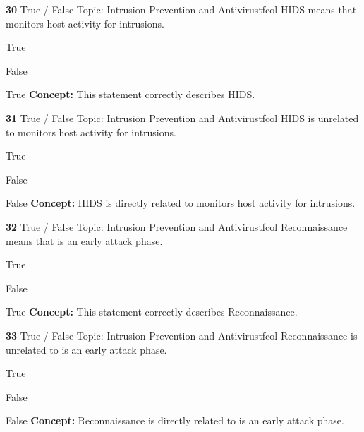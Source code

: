 \documentclass[10pt,a4paper]{article}
\begin{document}
\begin{qcard}{\color{white}\textbf{30} \hfill \small True / False \textbar{} Topic: Intrusion Prevention and Antivirus}{tfcol}
HIDS means that monitors host activity for intrusions.

\begin{qoptions}
\item True
\item False
\end{qoptions}
\begin{explainbox}{True}
\textbf{Concept:} This statement correctly describes HIDS.
\end{explainbox}
\end{qcard}

\begin{qcard}{\color{white}\textbf{31} \hfill \small True / False \textbar{} Topic: Intrusion Prevention and Antivirus}{tfcol}
HIDS is unrelated to monitors host activity for intrusions.

\begin{qoptions}
\item True
\item False
\end{qoptions}
\begin{explainbox}{False}
\textbf{Concept:} HIDS is directly related to monitors host activity for intrusions.
\end{explainbox}
\end{qcard}

\begin{qcard}{\color{white}\textbf{32} \hfill \small True / False \textbar{} Topic: Intrusion Prevention and Antivirus}{tfcol}
Reconnaissance means that is an early attack phase.

\begin{qoptions}
\item True
\item False
\end{qoptions}
\begin{explainbox}{True}
\textbf{Concept:} This statement correctly describes Reconnaissance.
\end{explainbox}
\end{qcard}

\begin{qcard}{\color{white}\textbf{33} \hfill \small True / False \textbar{} Topic: Intrusion Prevention and Antivirus}{tfcol}
Reconnaissance is unrelated to is an early attack phase.

\begin{qoptions}
\item True
\item False
\end{qoptions}
\begin{explainbox}{False}
\textbf{Concept:} Reconnaissance is directly related to is an early attack phase.
\end{explainbox}
\end{qcard}
\end{document}
